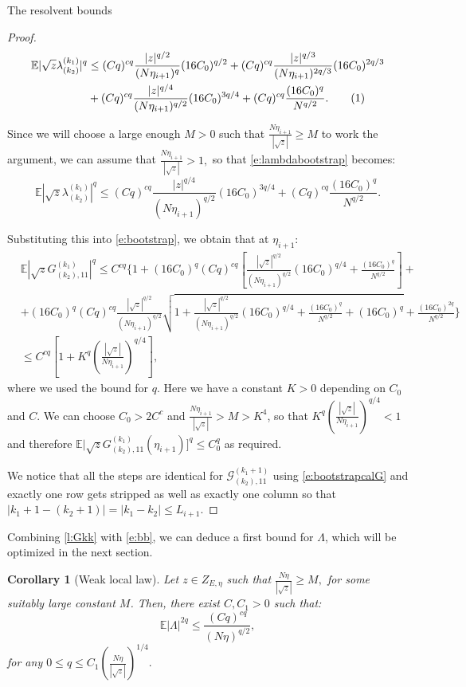 \documentclass[11pt, a4paper, oneside]{book}
\numberwithin{equation}{chapter}
\newcommand{\E}{\mathbb E}
\newcommand\numberthis{\addtocounter{equation}{1}\tag{\theequation}}
\newtheorem{cor}[thm]{Corollary}
\begin{document}
\begin{section}{The resolvent bounds}
\begin{proof}
%
\begin{align*}\label{e:lambdabootstrap}
\E | \sqrt{z} \lambda^{(k_1)}_{(k_2)} |^q
&\leq  (Cq)^{cq} \frac{|z|^{q/2}}{(N\eta_{i+1})^q} (16C_0)^{q/2} + (Cq)^{cq} \frac{|z|^{q/3}}{(N\eta_{i+1})^{2q/3}} (16C_0)^{2q/3} \\
&+ (Cq)^{cq} \frac{|z|^{q/4}}{(N\eta_{i+1})^{q/2}} (16C_0)^{3q/4} + (Cq)^{cq} \frac{(16C_0)^q}{N^{q/2}} . \numberthis
\end{align*}

\pagebreak

Since we will choose a large enough $M>0$ such that $\frac{N\eta_{i+1}}{|\sqrt{z}|} \geq M$ to work the argument, we can assume that $\frac{N\eta_{i+1}}{|\sqrt{z}|} > 1,$ so that \eqref{e:lambdabootstrap} becomes:
%
\begin{equation} \label{e:lambda-boot}
    \E | \sqrt{z} \lambda^{(k_1)}_{(k_2)} |^q \leq  (Cq)^{cq} \frac{|z|^{q/4}}{(N\eta_{i+1})^{q/2}} (16C_0)^{3q/4} + (Cq)^{cq} \frac{(16C_0)^q}{N^{q/2}} . 
\end{equation}

Substituting this into \eqref{e:bootstrap}, we obtain that at $\eta_{i+1}$:
%
\begin{align*}
&\E |\sqrt{z}G^{(k_1)}_{(k_2), 11}|^q \leq C^{cq} \Bigg \{ 1 + (16C_0)^q (Cq)^{cq} \left [ \frac{|\sqrt{z}|^{q/2}} {(N\eta_{i+1})^{q/2}}  (16C_0 )^{q/4} + \frac{(16C_0)^{q}}{N^{q/2}} \right ] +
\\
 &+
 (16C_0)^q  (Cq)^{cq} \frac{|\sqrt{z}|^{q/2}}{(N\eta_{i+1})^{q/2}} \sqrt{1 + \frac{|\sqrt{z}|^{q/2}}{(N\eta_{i+1})^{q/2}} (16C_0)^{q/4} + \frac{(16C_0)^{q}}{N^{q/2}}+ (16C_0)^{q}} + \frac{(16C_0)^{2q}}{N^{q/2}}
\Bigg \} \\
&\leq C^{cq} \left [ 1 + K^q \left( \frac{ |\sqrt{z}| } {N\eta_{i+1}} \right)^{q/4}  \right ] , \end{align*}
%
where we used the bound for $q$. Here we have a constant $K>0$ depending on $C_0$ and $C$. We can choose $C_0 > 2C^{c}$ and $ \frac{ N \eta_{i+1}}{|\sqrt{z}|} > M > K^{4}$, so that $ K^q \left( \frac{|\sqrt{z}|} {N\eta_{i+1}} \right)^{q/4} <1$ and therefore $\E|\sqrt{z} G^{(k_1)}_{(k_2),11}(\eta_{i+1})]^q \leq C_0^q$ as required. 

We notice that all the steps are identical for $\mathcal{G}^{(k_1+1)}_{(k_2), 11}$ using  \eqref{e:bootstrapcalG} and exactly one row gets stripped as well as exactly one column so that $|k_1+1 -(k_2+1)| = |k_1 - k_2|\leq L_{i+1}.$
\end{proof}
%
Combining \ref{l:Gkk} with \eqref{e:bb}, we can deduce a first bound for $\Lambda$, which will be optimized in the next section.
%
\begin{cor}[Weak local law] Let $z \in Z_{E,\eta}$ such that $\frac{N\eta}{|\sqrt{z}|} \geq M,$ for some suitably large constant $M$. Then, there exist $C,C_1>0$ such that:
\[
\E | \Lambda |^{2q} \leq \frac{(Cq)^{cq}}{(N\eta)^{q/2}},
\]
for any $0\leq q \leq C_1 \left (\frac{N\eta}{|\sqrt{z}|} \right )^{1/4}.$
\end{cor}
%
\end{section}
\end{document}
